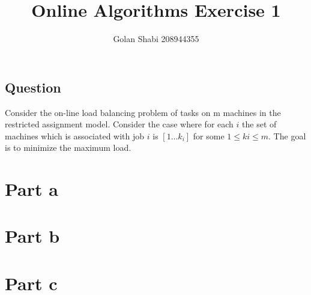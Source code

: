 \documentclass{article}
\title{Online Algorithms Exercise 1}
\author{Golan Shabi 208944355}
\begin{document}
\maketitle
\subsection*{Question}
Consider the on-line load balancing problem of tasks on m machines in the restricted assignment
model. Consider the case where for each $i$ the set of machines which is associated with job $i$ is $[1\dots k_{i}]$
for some $1 \leq  ki \leq  m$. The goal is to minimize the maximum load.

\section{Part a}

\pagebreak

\section{Part b}

\pagebreak

\section{Part c}

\end{document}
